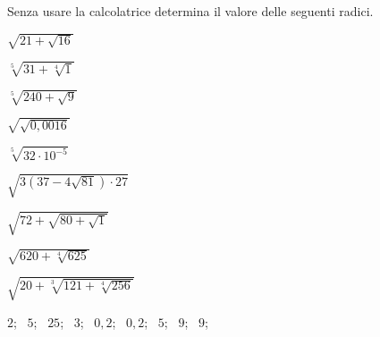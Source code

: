 \begin{esercizio}[*]
\label{ese:2.09}
Senza usare la calcolatrice determina il valore delle seguenti radici.
\vspace{-.7em}
\begin{htmulticols}{3}
\begin{enumeratea}
\item \(\sqrt{21+\sqrt{16}}\)
\item \(\sqrt[5]{31+\sqrt[4]1}\)
\item \(\sqrt[5]{240+\sqrt 9}\)
\item \(\sqrt{\sqrt{0,0016}}\)
\item \(\sqrt[5]{32\cdot 10^{-5}}\)
\item \(\sqrt{3 (37-4\sqrt{81})\cdot 27}\)
\item \(\sqrt{72+\sqrt{80+\sqrt 1}}\)
\item \(\sqrt{620+\sqrt[4]{625}}\)
\item \(\sqrt{20+\sqrt[3]{121+\sqrt[4]{256}}}\)
\end{enumeratea}
\end{htmulticols}
\noindent\! \(2\);~ 
 \(5\);~ 
 \(25\);~ 
 \(3\);~ 
 \(0,2\);~ 
 \(0,2\);~ 
 \(5\);~
 \(9\);~ 
 \(9\);~ 
\end{esercizio}



